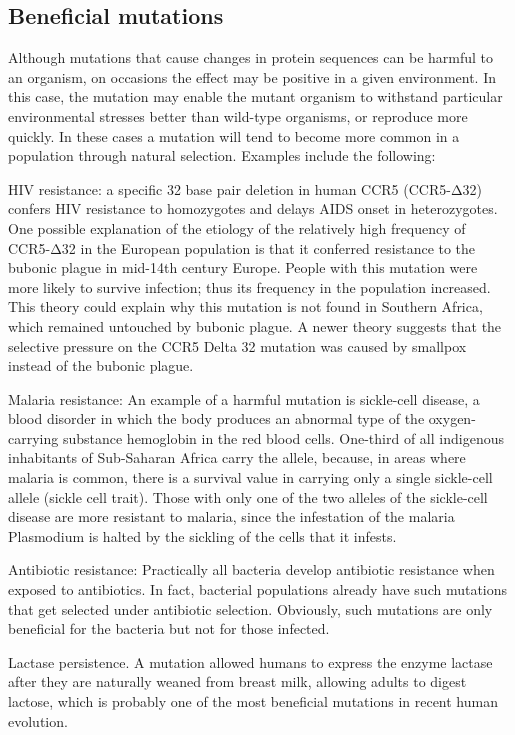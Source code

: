 \hypertarget{beneficial-mutations}{%
\subsection{Beneficial mutations}\label{beneficial-mutations}}

Although mutations that cause changes in protein sequences can be harmful to an organism, on occasions the effect may be positive in a given environment. In this case, the mutation may enable the mutant organism to withstand particular environmental stresses better than wild-type organisms, or reproduce more quickly. In these cases a mutation will tend to become more common in a population through natural selection. Examples include the following:

HIV resistance: a specific 32 base pair deletion in human CCR5 (CCR5-Δ32) confers HIV resistance to homozygotes and delays AIDS onset in heterozygotes. One possible explanation of the etiology of the relatively high frequency of CCR5-Δ32 in the European population is that it conferred resistance to the bubonic plague in mid-14th century Europe. People with this mutation were more likely to survive infection; thus its frequency in the population increased. This theory could explain why this mutation is not found in Southern Africa, which remained untouched by bubonic plague. A newer theory suggests that the selective pressure on the CCR5 Delta 32 mutation was caused by smallpox instead of the bubonic plague.

Malaria resistance: An example of a harmful mutation is sickle-cell disease, a blood disorder in which the body produces an abnormal type of the oxygen-carrying substance hemoglobin in the red blood cells. One-third of all indigenous inhabitants of Sub-Saharan Africa carry the allele, because, in areas where malaria is common, there is a survival value in carrying only a single sickle-cell allele (sickle cell trait). Those with only one of the two alleles of the sickle-cell disease are more resistant to malaria, since the infestation of the malaria Plasmodium is halted by the sickling of the cells that it infests.

Antibiotic resistance: Practically all bacteria develop antibiotic resistance when exposed to antibiotics. In fact, bacterial populations already have such mutations that get selected under antibiotic selection. Obviously, such mutations are only beneficial for the bacteria but not for those infected.

Lactase persistence. A mutation allowed humans to express the enzyme lactase after they are naturally weaned from breast milk, allowing adults to digest lactose, which is probably one of the most beneficial mutations in recent human evolution.

